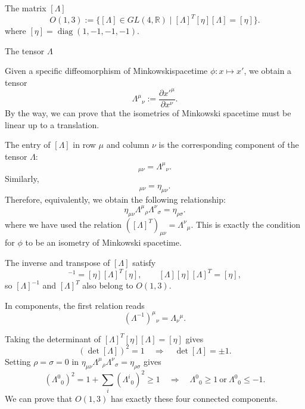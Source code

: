 \documentclass[11pt,a4paper]{article}
\newcommand{\topic}[1]{\par\addvspace{\medskipamount}\noindent{\bfseries\boldmath #1}\par\nopagebreak}
\begin{document}
The matrix $[\Lambda]$
\begin{equation*}
O(1,3):=\{[\Lambda]\in GL(4,\mathbb R)\mid [\Lambda]^T[\eta][\Lambda]=[\eta]\}.
\tag{0.16}\label{eq:0.16}
\end{equation*}
where $[\eta]=\operatorname{diag}(1,-1,-1,-1)$.

The tensor $\Lambda$

Given a specific diffeomorphism of Minkowskispacetime $\phi:x\mapsto x'$, we obtain a tensor
\begin{equation*}
\Lambda^\mu{}_\nu:=\frac{\partial x'^\mu}{\partial x^\nu}.
\tag{0.17}\label{eq:0.17}
\end{equation*}
By the way, we can prove that the isometries of Minkowski spacetime must be linear up to a translation.

The entry of $[\Lambda]$ in row $\mu$ and column $\nu$ is the corresponding component of the tensor $\Lambda$:
\begin{equation*}
[\Lambda]_{\mu\nu}=\Lambda^\mu{}_\nu.
\tag{0.18}\label{eq:0.18}
\end{equation*}
Similarly,
\begin{equation*}
[\eta]_{\mu\nu}=\eta_{\mu\nu}.
\tag{0.19}\label{eq:0.19}
\end{equation*}
Therefore, equivalently, we obtain the following relationship:
\begin{equation*}
\eta_{\mu\nu}\Lambda^\mu{}_\rho\Lambda^\nu{}_\sigma=\eta_{\rho\sigma}.
\tag{0.20}\label{eq:0.20}
\end{equation*}
where we have used the relation $([\Lambda]^T)_{\mu\nu}=\Lambda^\nu{}_\mu$. This is exactly the condition for $\phi$ to be an isometry of Minkowski spacetime.

The inverse and transpose of $[\Lambda]$ satisfy
\begin{equation*}
[\Lambda]^{-1}=[\eta][\Lambda]^T[\eta],\qquad
[\Lambda][\eta][\Lambda]^T=[\eta],
\tag{0.21}\label{eq:0.21}
\end{equation*}
so $[\Lambda]^{-1}$ and $[\Lambda]^T$ also belong to $O(1,3)$.

In components, the first relation reads
\begin{equation*}
(\Lambda^{-1})^\mu{}_\nu=\Lambda_\nu{}^\mu.
\tag{0.22}\label{eq:0.22}
\end{equation*}

\bigskip

\topic{Connectedness}

Taking the determinant of $[\Lambda]^T[\eta][\Lambda]=[\eta]$ gives
\begin{equation*}
(\det[\Lambda])^2=1\quad\Longrightarrow\quad\det[\Lambda]=\pm1.
\tag{0.23}\label{eq:0.23}
\end{equation*}
Setting $\rho=\sigma=0$ in $\eta_{\mu\nu}\Lambda^\mu{}_\rho\Lambda^\nu{}_\sigma=\eta_{\rho\sigma}$ gives
\begin{equation*}
(\Lambda^0{}_0)^2=1+\sum_i(\Lambda^i{}_0)^2\ge1\quad\Longrightarrow\quad\Lambda^0{}_0\ge1\ \text{or}\ \Lambda^0{}_0\le-1.
\tag{0.24}\label{eq:0.24}
\end{equation*}
We can prove that $O(1,3)$ has exactly these four connected components.
\end{document}
